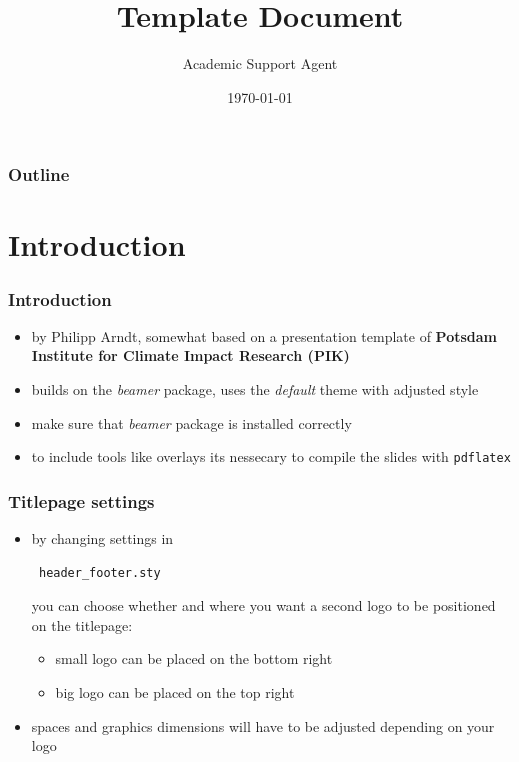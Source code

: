\documentclass{article}
\title{Template Document}
\author{Academic Support Agent}
\date{\today}
\begin{document}
\maketitle



\presentationtitle{\tit}{\subtit}{\auth}{\dat}
\begin{frame}
\frametitle{Outline} 

\end{frame}

\section{Introduction}

\begin{frame}
\frametitle{Introduction}

\begin{itemize}
\item by Philipp Arndt, somewhat based on a presentation template of {\bf Potsdam Institute for Climate Impact Research (PIK)}
\item builds on the {\it beamer} package, uses the {\it default} theme with adjusted style
\item make sure that {\it beamer} package is installed correctly 
\item to include tools like overlays its nessecary to compile the slides with {\tt pdflatex}
\end{itemize}
\end{frame}

\begin{frame}[fragile]
\frametitle{Titlepage settings}
\begin{itemize}
\item by changing settings in \begin{verbatim} header_footer.sty \end{verbatim} you can choose whether and where you want a second logo to be positioned on the titlepage:
\begin{itemize}
\item small logo can be placed on the bottom right
\item big logo can be placed on the top right
\end{itemize}
\item spaces and graphics dimensions will have to be adjusted depending on your logo
\end{itemize}
\end{frame}
\end{document}
